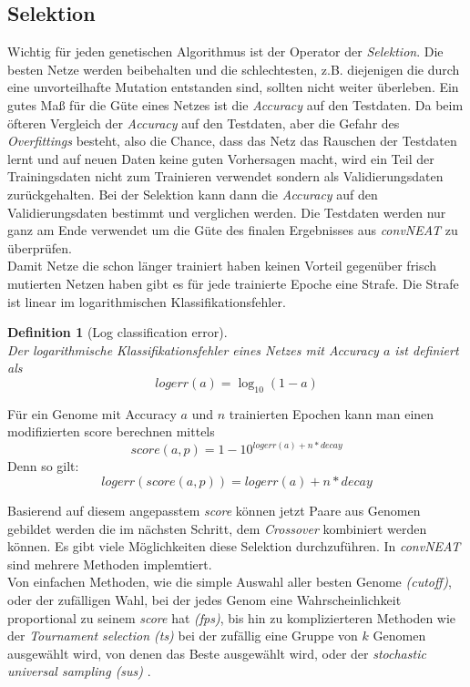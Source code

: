 \documentclass[]{scrartcl}
\newtheorem{defi}[satz]{Definition}
\begin{document}
		\subsection{Selektion}\label{select}
			
			Wichtig für jeden genetischen Algorithmus ist der Operator der \textit{Selektion}. Die besten Netze werden beibehalten und die schlechtesten,
			z.B. diejenigen die durch eine unvorteilhafte Mutation entstanden sind, sollten nicht weiter überleben.
			Ein gutes Maß für die Güte eines Netzes ist die \textit{Accuracy} auf den Testdaten. Da beim öfteren Vergleich der \textit{Accuracy} auf den Testdaten,
			aber die Gefahr des \textit{Overfittings} besteht, also die Chance, dass das Netz das Rauschen der Testdaten lernt und auf neuen Daten keine guten Vorhersagen macht,
			wird ein Teil der Trainingsdaten nicht zum Trainieren verwendet sondern als Validierungsdaten zurückgehalten.
			Bei der Selektion kann dann die \textit{Accuracy} auf den Validierungsdaten bestimmt und verglichen werden.
			Die Testdaten werden nur ganz am Ende verwendet um die Güte des finalen Ergebnisses aus \textit{convNEAT} zu überprüfen.\\

			Damit Netze die schon länger trainiert haben keinen Vorteil gegenüber frisch mutierten Netzen haben gibt es für jede trainierte Epoche eine Strafe.
			Die Strafe ist linear im logarithmischen Klassifikationsfehler.

			\begin{defi}[Log classification error] ~ \\
				Der logarithmische Klassifikationsfehler eines Netzes mit Accuracy $a$ ist definiert als \\
				$$ logerr(a) = \log_{10}(1 - a)$$
			\end{defi}
		
			Für ein Genome mit Accuracy $a$ und $n$ trainierten Epochen kann man einen modifizierten score berechnen mittels\\
			$$score(a, p) =  1 - 10^{logerr(a) + n * decay}$$
			Denn so gilt:
			$$ logerr(score(a, p)) = logerr(a) + n * decay$$

			Basierend auf diesem angepasstem \textit{score} können jetzt Paare aus Genomen gebildet werden die im nächsten Schritt, dem \textit{Crossover} kombiniert werden können.
			Es gibt viele Möglichkeiten diese Selektion durchzuführen. In \textit{convNEAT} sind mehrere Methoden implemtiert. \\
			Von einfachen Methoden, wie die simple Auswahl aller besten Genome \textit{(cutoff)}, oder der zufälligen Wahl, bei der jedes Genom eine Wahrscheinlichkeit
			proportional zu seinem \textit{score} hat \textit{(fps)}, bis hin zu komplizierteren Methoden wie der \textit{Tournament selection (ts)} bei der zufällig eine
			Gruppe von $k$ Genomen ausgewählt wird, von denen das Beste ausgewählt wird, oder der \textit{stochastic universal sampling (sus)} \cite{sus}.
\end{document}

